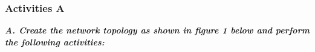 \documentclass[a4paper,11pt]{article}
\begin{document}
%
%


\subsubsection{Activities A}

{\bfseries \textit{A. Create the network topology as shown in figure 1 below and perform the following activities:}}
\end{document}
